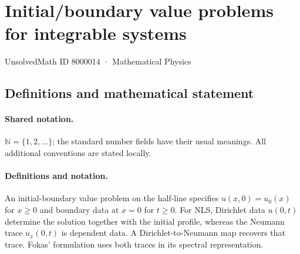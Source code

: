 \documentclass[11pt]{article}
\begin{document}
\setcounter{section}{8000013}
\section{Initial/boundary value problems for integrable systems}\label{8000014}
{\small UnsolvedMath ID 8000014 · Mathematical Physics}
\subsection{Definitions and mathematical statement}

\paragraph{Shared notation.}$\mathbb N=\{1,2,\ldots\}$; the standard number fields have their usual meanings. All additional conventions are stated locally.


\paragraph{Definitions and notation.}An initial-boundary value problem on the half-line specifies $u(x,0)=u_0(x)$ for $x\ge0$ and boundary data at $x=0$ for $t\ge0$. For NLS, Dirichlet data $u(0,t)$ determine the solution together with the initial profile, whereas the Neumann trace $u_x(0,t)$ is dependent data. A Dirichlet-to-Neumann map recovers that trace. Fokas' formulation uses both traces in its spectral representation.
\end{document}
